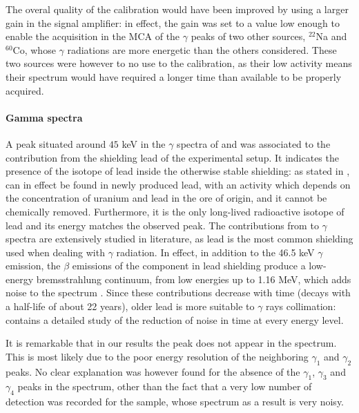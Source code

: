 The overal quality of the calibration would have been improved by using a larger  gain in the signal amplifier:
in effect, the gain was set to a value low enough to enable the acquisition in the MCA of the $\gamma$ peaks of two other sources, $^{22}$Na and $^{60}$Co, whose $\gamma$ radiations are more energetic than the others considered.
These two sources were however to no use to the calibration, as their low activity means their spectrum would have required a longer time than available to be properly acquired.

\paragraph{Gamma spectra}
A peak situated around $45$ keV in the $\gamma$ spectra of \cesium and \hafnium was associated to the contribution from the shielding lead of the experimental setup.
It indicates the presence of the \lead isotope of lead inside the otherwise stable shielding:
as stated in \cite{korun_influence_2009}, \lead can in effect be found in newly produced lead, with an activity which depends on the concentration of uranium and lead in the ore of origin, and it cannot be chemically removed.
Furthermore, it is the only long-lived radioactive isotope of lead and its energy matches the observed peak.
The contributions from \lead to $\gamma$ spectra are extensively studied in literature, as lead is the most common shielding used when dealing with $\gamma$ radiation.
In effect, in addition to the 46.5 keV $\gamma$ emission, the $\beta$ emissions of the \lead component in lead shielding produce a low-energy bremsstrahlung
continuum, from low energies up to 1.16 MeV, which adds noise to the spectrum \cite{smith_evaluation_2008}.
Since these contributions decrease with time (\lead decays with a half-life of about 22 years), older lead is more suitable to $\gamma$ rays collimation:
\cite{korun_influence_2009} contains a detailed study of the reduction of noise in time at every energy level.

It is remarkable that in our results the \lead peak does not appear in the \cobalt spectrum. 
This is most likely due to the poor energy resolution of the neighboring $\gamma_1$ and $\gamma_2$ peaks.
No clear explanation was however found for the absence of the $\gamma_1$, $\gamma_3$ and $\gamma_4$ peaks in the \hafnium spectrum, other than the fact that a very low number of detection was recorded for the sample, whose spectrum as a result is very noisy.

